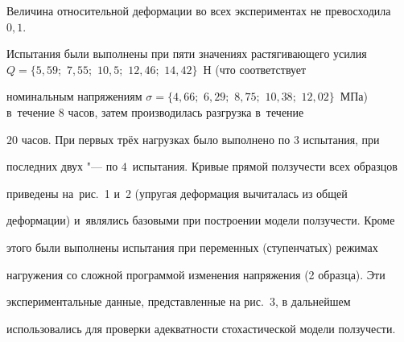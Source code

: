 Величина относительной деформации во всех экспериментах не превосходила~$0{,}1$.



Испытания были выполнены при пяти значениях растягивающего усилия $Q = 

\{ 5,59;$ $7,55;$ $10,5;$ $12,46;$ $14,42 \}$~Н (что соответствует 

номинальным напряжениям $\sigma = \{ 4,66;$ $6,29;$ $8,75;$ $10,38;$ $12,02 \}$~МПа) в~течение $8$ часов, затем производилась разгрузка в~течение 

$20$ часов. При первых трёх нагрузках было выполнено по $3$ испытания, при 

последних двух "--- по $4$~испытания. Кривые прямой ползучести всех образцов 

приведены на~рис.~1 и~2 (упругая деформация вычиталась из общей 

деформации) и~являлись базовыми при построении модели ползучести. Кроме 

этого были выполнены испытания при переменных (ступенчатых) режимах 

нагружения со сложной программой изменения напряжения (2 образца). Эти 

экспериментальные данные, представленные на рис.~3, в дальнейшем 

использовались для проверки адекватности стохастической модели ползучести.



